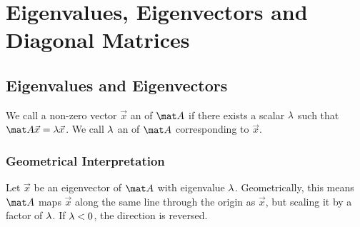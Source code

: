 \chapter{Eigenvalues, Eigenvectors and Diagonal Matrices}\label{chap:eigen}

\section{Eigenvalues and Eigenvectors}

\begin{definition}
    We call a non-zero vector $\vec x$ an  of $\mat A$ if there exists a scalar $\lambda$ such that $\mat A \vec x = \l \vec x$. We call $\lambda$ an  of $\mat A$ corresponding to $\vec x$.
\end{definition}

\subsection{Geometrical Interpretation}

Let $\vec x$ be an eigenvector of $\mat A$ with eigenvalue $\lambda$. Geometrically, this means $\mat A$ maps $\vec x$ along the same line through the origin as $\vec x$, but scaling it by a factor of $\lambda$. If $\lambda < 0$, the direction is reversed.

